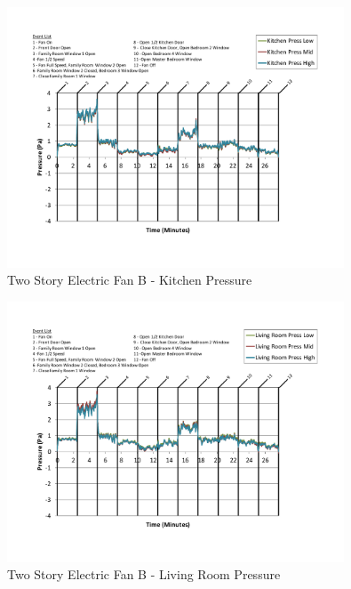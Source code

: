 \documentclass{article}
\begin{document}
\begin{appendices}
	\begin{figure}[H]
		\centering
		\includegraphics[height=3.05in,trim=0.67in 1.1in 0.67in 0.8in,clip=true]{0_Images/Results_Charts/ColdFlow/Two_Story/Electric/B/Kitchen_Pressure.pdf}
		\caption{Two Story Electric Fan B - Kitchen Pressure}
	\end{figure}
 

	\begin{figure}[H]
		\centering
		\includegraphics[height=3.05in,trim=0.67in 1.1in 0.67in 0.8in,clip=true]{0_Images/Results_Charts/ColdFlow/Two_Story/Electric/B/Living_Room_Pressure.pdf}
		\caption{Two Story Electric Fan B - Living Room Pressure}
	\end{figure}
 
	\clearpage


\end{appendices}
\end{document}
